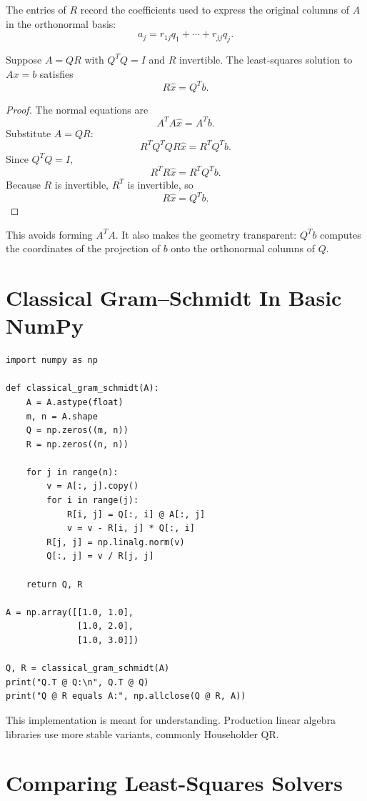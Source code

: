 The entries of $R$ record the coefficients used to express the original
columns of $A$ in the orthonormal basis:
\[
  a_j = r_{1j}q_1+\cdots+r_{jj}q_j.
\]

\begin{proposition}
Suppose $A=QR$ with $Q^TQ=I$ and $R$ invertible. The least-squares solution to
$Ax=b$ satisfies
\[
  R\hat{x}=Q^Tb.
\]
\end{proposition}

\begin{proof}
The normal equations are
\[
  A^TA\hat{x}=A^Tb.
\]
Substitute $A=QR$:
\[
  R^TQ^TQR\hat{x}=R^TQ^Tb.
\]
Since $Q^TQ=I$,
\[
  R^TR\hat{x}=R^TQ^Tb.
\]
Because $R$ is invertible, $R^T$ is invertible, so
\[
  R\hat{x}=Q^Tb.
\]
\end{proof}

This avoids forming $A^TA$. It also makes the geometry transparent:
$Q^Tb$ computes the coordinates of the projection of $b$ onto the orthonormal
columns of $Q$.

\section{Classical Gram--Schmidt In Basic NumPy}

\begin{lstlisting}
import numpy as np

def classical_gram_schmidt(A):
    A = A.astype(float)
    m, n = A.shape
    Q = np.zeros((m, n))
    R = np.zeros((n, n))

    for j in range(n):
        v = A[:, j].copy()
        for i in range(j):
            R[i, j] = Q[:, i] @ A[:, j]
            v = v - R[i, j] * Q[:, i]
        R[j, j] = np.linalg.norm(v)
        Q[:, j] = v / R[j, j]

    return Q, R

A = np.array([[1.0, 1.0],
              [1.0, 2.0],
              [1.0, 3.0]])

Q, R = classical_gram_schmidt(A)
print("Q.T @ Q:\n", Q.T @ Q)
print("Q @ R equals A:", np.allclose(Q @ R, A))
\end{lstlisting}

This implementation is meant for understanding. Production linear algebra
libraries use more stable variants, commonly Householder QR.

\section{Comparing Least-Squares Solvers}

